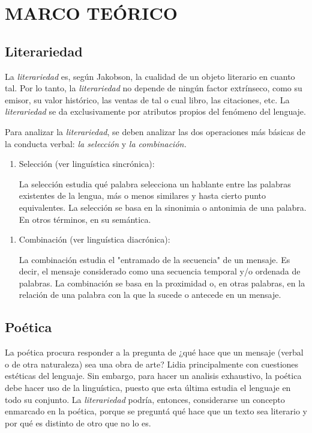 \documentclass[twoside]{article}
\begin{document}
\section{MARCO TEÓRICO}
\label{sec:orge6a0cd1}

\subsection{Literariedad}
\label{sec:org5ae25ef}


La \emph{literariedad} es, según Jakobson, la cualidad de un objeto
literario en cuanto tal. Por lo tanto, la \emph{literariedad} no depende de
ningún factor extrínseco, como su emisor, su valor histórico, las
ventas de tal o cual libro, las citaciones, etc. La \emph{literariedad} se
da exclusivamente por atributos propios del fenómeno del lenguaje.

Para analizar la \emph{literariedad}, se deben analizar las dos operaciones
más básicas de la conducta verbal: \emph{la selección} y \emph{la combinación.}


\begin{enumerate}
\item Selección (ver linguística sincrónica):

La selección estudia qué palabra selecciona un hablante entre las
palabras existentes de la lengua, más o menos similares y hasta
cierto punto equivalentes. La selección se basa en la sinonimia o
antonimia de una palabra. En otros términos, en su semántica.
\end{enumerate}



\begin{enumerate}
\item Combinación (ver linguística diacrónica):

La combinación estudia el "entramado de la secuencia" de un
mensaje. Es decir, el mensaje considerado como una secuencia
temporal y/o ordenada de palabras. La combinación se basa en la
proximidad o, en otras palabras, en la relación de una palabra con
la que la sucede o antecede en un mensaje.
\end{enumerate}




\subsection{Poética}
\label{sec:org3034131}
La poética procura responder a la pregunta de ¿qué hace que un
mensaje (verbal o de otra naturaleza) sea una obra de arte? Lidia
principalmente con cuestiones estéticas del lenguaje. Sin embargo,
para hacer un analisis exhaustivo, la poética debe hacer uso de la
linguística, puesto que esta última estudia el lenguaje en todo su
conjunto. La \emph{literariedad} podría, entonces, considerarse un
concepto enmarcado en la poética, porque se preguntá qué hace que
un texto sea literario y por qué es distinto de otro que no lo es.
\end{document}
